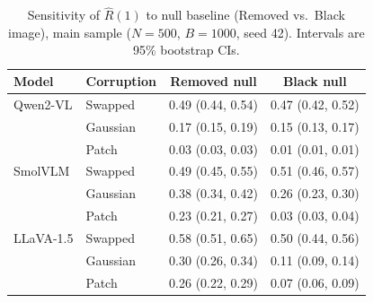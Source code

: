 \begin{table}[t]
\centering
\caption{Sensitivity of $\hat{R}(1)$ to null baseline (Removed vs.\ Black image),
  main sample ($N=500$, $B=1000$, seed 42). Intervals are 95\% bootstrap CIs.}
\label{tab:nullsens-rhat}
{\footnotesize\setlength{\tabcolsep}{3pt}%
\begin{tabular}{llcc}
\toprule
\textbf{Model} & \textbf{Corruption} & Removed null & Black null \\
\midrule
Qwen2-VL  & Swapped  & 0.49 (0.44, 0.54) & 0.47 (0.42, 0.52) \\
          & Gaussian & 0.17 (0.15, 0.19) & 0.15 (0.13, 0.17) \\
          & Patch    & 0.03 (0.03, 0.03) & 0.01 (0.01, 0.01) \\
SmolVLM   & Swapped  & 0.49 (0.45, 0.55) & 0.51 (0.46, 0.57) \\
          & Gaussian & 0.38 (0.34, 0.42) & 0.26 (0.23, 0.30) \\
          & Patch    & 0.23 (0.21, 0.27) & 0.03 (0.03, 0.04) \\
LLaVA-1.5 & Swapped  & 0.58 (0.51, 0.65) & 0.50 (0.44, 0.56) \\
           & Gaussian & 0.30 (0.26, 0.34) & 0.11 (0.09, 0.14) \\
           & Patch    & 0.26 (0.22, 0.29) & 0.07 (0.06, 0.09) \\
\bottomrule
\end{tabular}}
\end{table}
